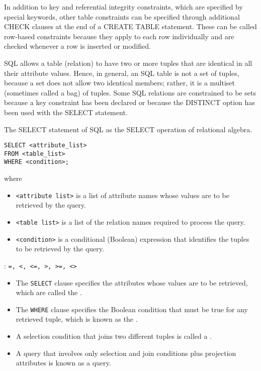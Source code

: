    \par In addition to key and referential integrity constraints, which are specified by special keywords, other table constraints can be specified through additional CHECK clauses at the end of a CREATE TABLE statement. These can be called row-based constraints because they apply to each row individually and are checked whenever a row is inserted or modified.


    \par SQL allows a table (relation) to have two or more tuples that are identical in all their attribute values. Hence, in general, an SQL table is not a set of tuples, because a set does not
allow two identical members; rather, it is a multiset (sometimes called a bag) of tuples. Some SQL relations are constrained to be sets because a key constraint has been declared or because the DISTINCT option has been used with the SELECT statement.

    \par The SELECT statement of SQL  as the SELECT operation of relational algebra.

    \begin{lstlisting}
SELECT <attribute_list>
FROM <table_list>
WHERE <condition>;
    \end{lstlisting}
      where
    \begin{itemize}
      \item \lstinline{<attribute list>} is a list of attribute names whose values are to be retrieved by the query.
      \item \lstinline{<table list>} is a list of the relation names required to process the query.
      \item \lstinline{<condition>} is a conditional (Boolean) expression that identifies the tuples to be retrieved by the query.
    \end{itemize}

    \par {}: \lstinline{=, <, <=, >, >=, <>}

    \begin{itemize}
      \item The \lstinline{SELECT} clause specifies the attributes whose values are to be retrieved, which are called the .
      \item The \lstinline{WHERE} clause specifies the Boolean condition that must be true for any retrieved tuple, which is known as the .
      \item A selection condition that joins two different tuples is called a .
      \item A query that involves only selection and join conditions plus projection attributes is known as a  query.
    \end{itemize}

